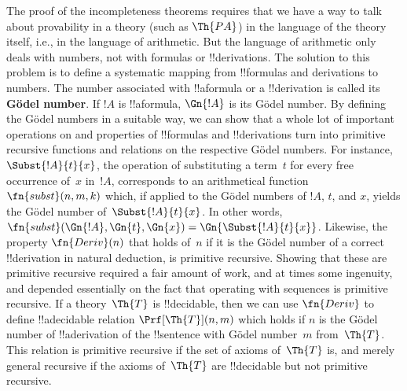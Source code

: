 The proof of the incompleteness theorems requires that we have a way
to talk about provability in a theory (such as $\Th{PA}$) in the
language of the theory itself, i.e., in the language of
arithmetic. But the language of arithmetic only deals with numbers,
not with formulas or !!{derivation}s.  The solution to this problem is
to define a systematic mapping from !!{formula}s and derivations to
numbers. The number associated with !!a{formula} or a !!{derivation}
is called its \textbf{G\"odel number}.  If $!A$ is !!a{formula},
$\Gn{!A}$ is its G\"odel number. By defining the G\"odel numbers in a
suitable way, we can show that a whole lot of important operations on
and properties of !!{formula}s and !!{derivation}s turn into primitive
recursive functions and relations on the respective G\"odel
numbers. For instance, $\Subst{!A}{t}{x}$, the operation of
substituting a term~$t$ for every free occurrence of~$x$ in~$!A$,
corresponds to an arithmetical function $\fn{subst}(n,m,k)$ which, if
applied to the G\"odel numbers of $!A$, $t$, and $x$, yields the
G\"odel number of~$\Subst{!A}{t}{x}$. In other words,
$\fn{subst}(\Gn{!A}, \Gn{t}, \Gn{x}) =
\Gn{\Subst{!A}{t}{x}}$. Likewise, the property $\fn{Deriv}(n)$ that
holds of~$n$ if it is the G\"odel number of a correct !!{derivation}
in natural deduction, is primitive recursive.  Showing that these are
primitive recursive required a fair amount of work, and at times some
ingenuity, and depended essentially on the fact that operating with
sequences is primitive recursive.  If a theory~$\Th{T}$ is
!!{decidable}, then we can use $\fn{Deriv}$ to define !!a{decidable}
relation $\Prf[\Th{T}](n, m)$ which holds if $n$ is the G\"odel number
of !!a{derivation} of the !!{sentence} with G\"odel number~$m$
from~$\Th{T}$.  This relation is primitive recursive if the set of
axioms of~$\Th{T}$ is, and merely general recursive if the axioms
of~$\Th{T}$ are !!{decidable} but not primitive recursive.
